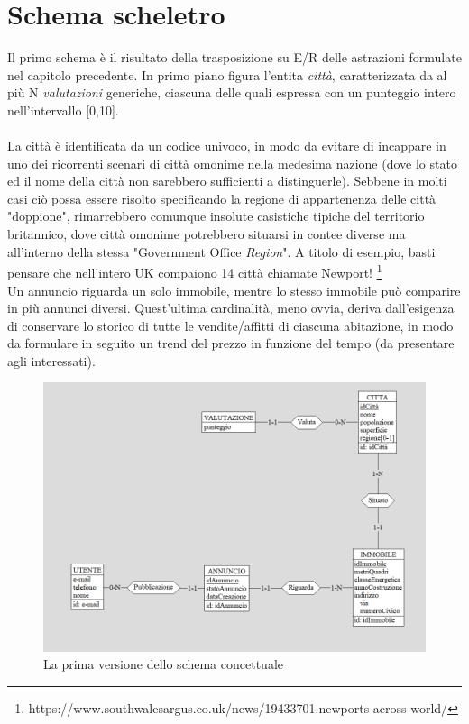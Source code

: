 \documentclass[a4paper,12pt]{report}
\begin{document}
        \section{Schema scheletro}
        Il primo schema è il risultato della trasposizione su E/R delle astrazioni formulate nel capitolo precedente.
        In primo piano figura l'entita \textit{città}, caratterizzata da al più N \textit{valutazioni} generiche,
        ciascuna delle quali espressa con un punteggio intero nell'intervallo [0,10]. \\
        \\
        La città è identificata da un codice univoco, in modo da evitare di incappare in uno dei ricorrenti scenari di 
        città omonime nella medesima nazione (dove lo stato ed il nome della città non sarebbero sufficienti a distinguerle). Sebbene in molti casi ciò possa essere risolto specificando la regione di appartenenza 
        delle città "doppione", rimarrebbero comunque insolute casistiche tipiche del territorio britannico, dove città omonime 
        potrebbero situarsi in contee diverse ma all'interno della stessa "Government Office \textit{Region}". A titolo di esempio, basti
        pensare che nell'intero UK compaiono 14 città chiamate Newport! \footnote{https://www.southwalesargus.co.uk/news/19433701.newports-across-world/} \\
        \newpage
        \noindent
        Un annuncio riguarda un solo immobile, mentre lo stesso immobile può comparire in più annunci diversi. Quest'ultima cardinalità,
        meno ovvia, deriva dall'esigenza di conservare lo storico di tutte le vendite/affitti di ciascuna abitazione, in modo da formulare
        in seguito un trend del prezzo in funzione del tempo (da presentare agli interessati).

        \begin{figure}[ht]
            \centering{}
            \includegraphics[width=\linewidth]{./images/first.png}
            \caption{La prima versione dello schema concettuale}
        \end{figure}
        
\end{document}
